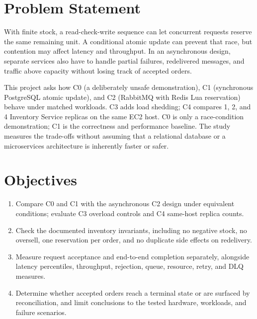 \documentclass[a4paper]{report}
\begin{document}
\section{Problem Statement}
\label{sec:problem}

With finite stock, a read-check-write sequence can let concurrent requests reserve
the same remaining unit. A conditional atomic update can prevent that race, but
contention may affect latency and throughput. In an asynchronous design, separate
services also have to handle partial failures, redelivered messages, and traffic
above capacity without losing track of accepted orders.

This project asks how C0 (a deliberately unsafe demonstration), C1 (synchronous
PostgreSQL atomic update), and C2 (RabbitMQ with Redis Lua reservation) behave under
matched workloads. C3 adds load shedding; C4 compares 1, 2, and 4 Inventory Service
replicas on the same EC2 host. C0 is only a race-condition demonstration; C1 is the
correctness and performance baseline. The study measures the trade-offs
without assuming that a relational database or a microservices architecture is
inherently faster or safer.

\section{Objectives}

\begin{enumerate}
  \item Compare C0 and C1 with the asynchronous C2 design under equivalent
    conditions; evaluate C3 overload controls and C4 same-host replica counts.
  \item Check the documented inventory invariants, including
    no negative stock, no oversell, one reservation per order, and no duplicate
    side effects on redelivery.
  \item Measure request acceptance and end-to-end completion separately, alongside
    latency percentiles, throughput, rejection, queue, resource, retry, and DLQ
    measures.
  \item Determine whether accepted orders reach a terminal state or are surfaced by
    reconciliation, and limit conclusions to the tested hardware, workloads, and
    failure scenarios.
\end{enumerate}
\end{document}
